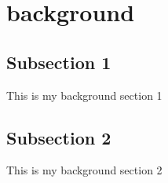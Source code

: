\section{background}
\label{sec:background}

\subsection{Subsection 1}

This is my background section 1

\subsection{Subsection 2}

This is my background section 2
